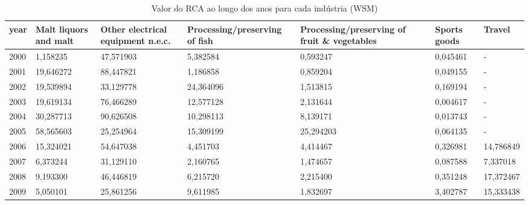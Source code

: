 \begin{table}
\centering
\caption{Valor do RCA ao longo dos anos para cada indústria (WSM)}
\begin{tabular}{p{1cm}p{2cm}p{2cm}p{2cm}p{2cm}p{2cm}p{2cm}}
\toprule
 year &  Malt liquors and malt &  Other electrical equipment n.e.c. &  Processing/preserving of fish &  Processing/preserving of fruit \& vegetables &  Sports goods &    Travel \\
\midrule
 2000 &               1,158235 &                          47,571903 &                       5,382584 &                                     0,593247 &      0,045461 &         - \\
 2001 &              19,646272 &                          88,447821 &                       1,186858 &                                     0,859204 &      0,049155 &         - \\
 2002 &              19,539894 &                          33,129778 &                      24,364096 &                                     1,513815 &      0,169194 &         - \\
 2003 &              19,619134 &                          76,466289 &                      12,577128 &                                     2,131644 &      0,004617 &         - \\
 2004 &              30,287713 &                          90,626508 &                      10,298113 &                                     8,139171 &      0,013743 &         - \\
 2005 &              58,565603 &                          25,254964 &                      15,309199 &                                    25,294203 &      0,064135 &         - \\
 2006 &              15,324021 &                          54,647038 &                       4,451703 &                                     4,414467 &      0,326981 & 14,786849 \\
 2007 &               6,373244 &                          31,129110 &                       2,160765 &                                     1,474657 &      0,087588 &  7,337018 \\
 2008 &               9,193300 &                          46,446819 &                       6,215720 &                                     2,215400 &      0,351248 & 17,372467 \\
 2009 &               5,050101 &                          25,861256 &                       9,611985 &                                     1,832697 &      3,402787 & 15,333438 \\

\end{tabular}
\end{table}

